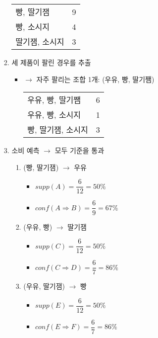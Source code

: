 \begin{itemize}
\begin{itemize}
\begin{enumerate}
\begin{table}[htp]
\begin{center}
\begin{tabular}{ll}
				빵, 딸기잼 & 9 \\
				빵, 소시지 & 4 \\
				딸기잼, 소시지 & 3\\
				\bottomrule
				\end{tabular}
				\end{center}
				\label{tab:twoitemssets}
				\end{table}%
		\item 세 제품이 팔린 경우를 추출
			\begin{itemize}
			\item $\rightarrow$ 자주 팔리는 조합 1개: (우유, 빵, 딸기쨈)		
				\begin{table}[h!]
				\begin{center}
				\begin{tabular}{ll}
				\toprule
				우유, 빵, 딸기쨈 & 6 \\
				우유, 빵, 소시지 & 1 \\
				빵, 딸기잼, 소시지 & 3 \\
				\bottomrule
				\end{tabular}
				\end{center}
				\label{tab:threeitemssets}
				\end{table}%
			\end{itemize}									
		\item 소비 예측 $\rightarrow$ 모두 기준을 통과			
			\begin{enumerate}
			\item (빵, 딸기잼) $\rightarrow$ 우유
				\begin{itemize}
				\item $supp(A) = \dfrac{6}{12} = 50\%$
				\item $conf(A \Rightarrow B) = \dfrac{6}{9} = 67\%$
				\end{itemize}
			\item (우유, 빵) $\rightarrow$ 딸기잼
				\begin{itemize}
				\item $supp(C) = \dfrac{6}{12} = 50\%$
				\item $conf(C \Rightarrow D) = \dfrac{6}{7} = 86\%$
				\end{itemize}
			\item (우유, 딸기잼) $\rightarrow$ 빵
				\begin{itemize}
				\item $supp(E) = \dfrac{6}{12} = 50\%$
				\item $conf(E \Rightarrow F) = \dfrac{6}{7} = 86\%$

\end{itemize}
\end{enumerate}
\end{enumerate}
\end{itemize}
\end{itemize}
